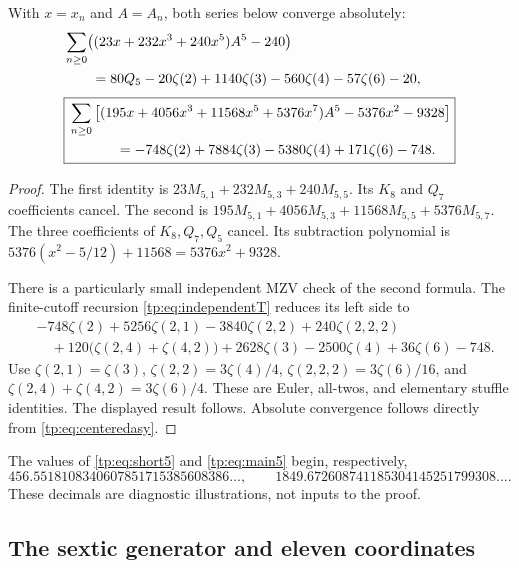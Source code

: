 \begin{corollary}
\label{tp:cor:explicit}
With $x=x_n$ and $A=A_n$, both series below converge absolutely:
\begin{align}
 &\sum_{n\geq0}\bigl((23x+232x^3+240x^5)A^5-240\bigr)\notag\\
 &\qquad=80Q_5-20\zeta(2)+1140\zeta(3)-560\zeta(4)
                         -57\zeta(6)-20,\label{tp:eq:short5}\\[3pt]
 &\boxed{\begin{aligned}
 &\sum_{n\geq0}\left[
 (195x+4056x^3+11568x^5+5376x^7)A^5
                  -5376x^2-9328\right]\\
 &\hspace{12mm}=-748\zeta(2)+7884\zeta(3)-5380\zeta(4)
                  +171\zeta(6)-748.
 \end{aligned}}\label{tp:eq:main5}
\end{align}
\end{corollary}

\begin{proof}
The first identity is $23M_{5,1}+232M_{5,3}+240M_{5,5}$.
Its $K_8$ and $Q_7$ coefficients cancel.  The second is
$195M_{5,1}+4056M_{5,3}+11568M_{5,5}+5376M_{5,7}$.
The three coefficients of $K_8,Q_7,Q_5$ cancel.  Its subtraction
polynomial is $5376(x^2-5/12)+11568=5376x^2+9328$.

There is a particularly small independent MZV check of the second
formula.  The finite-cutoff recursion \eqref{tp:eq:independentT}
reduces its left side to
\begin{align*}
 &-748\zeta(2)+5256\zeta(2,1)-3840\zeta(2,2)
   +240\zeta(2,2,2)\\
 &\quad+120\bigl(\zeta(2,4)+\zeta(4,2)\bigr)
   +2628\zeta(3)-2500\zeta(4)+36\zeta(6)-748.
\end{align*}
Use $\zeta(2,1)=\zeta(3)$,
$\zeta(2,2)=3\zeta(4)/4$,
$\zeta(2,2,2)=3\zeta(6)/16$, and
$\zeta(2,4)+\zeta(4,2)=3\zeta(6)/4$.
These are Euler, all-twos, and elementary stuffle identities.
The displayed result follows.  Absolute convergence follows directly
from \eqref{tp:eq:centeredasy}.
\end{proof}

The values of \eqref{tp:eq:short5} and \eqref{tp:eq:main5} begin,
respectively,
\[
 456.5518108340607851715385608386\ldots,
 \qquad1849.672608741185304145251799308\ldots.
\]
These decimals are diagnostic illustrations, not inputs to the proof.

\subsection{The sextic generator and eleven coordinates}

